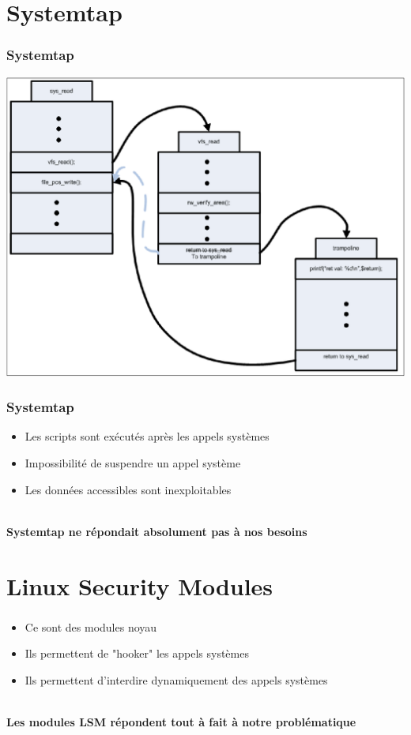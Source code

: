 \documentclass{beamer}
\begin{document}
\section{Systemtap}
\begin{frame}
\frametitle{Systemtap}
\begin{center}
	\includegraphics[scale=0.25]{kretprob.png}
\end{center}
\end{frame}

\begin{frame}
\frametitle{Systemtap}
\begin{itemize}
	\item Les scripts sont exécutés après les appels systèmes
	\item Impossibilité de suspendre un appel système
	\item Les données accessibles sont inexploitables
\end{itemize}
~\\
\textbf{Systemtap ne répondait absolument pas à nos besoins}

\end{frame}

\section{Linux Security Modules}
\begin{frame}
\frametitle{}
	\begin{itemize}
		\item Ce sont des modules noyau
		\item Ils permettent de "hooker" les appels systèmes
		\item Ils permettent d'interdire dynamiquement des appels systèmes
	\end{itemize}
~\\	
\textbf{Les modules LSM répondent tout à fait à notre problématique}
\end{frame}
\end{document}
